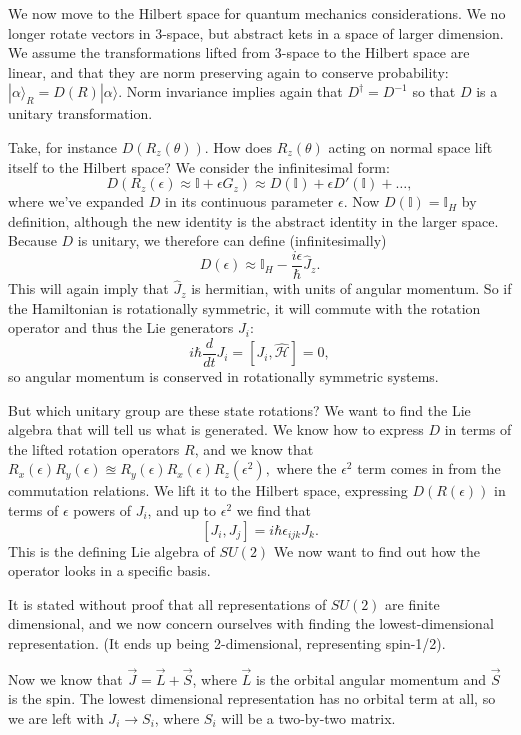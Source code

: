 \documentclass[fontsize=12pt]{scrartcl}
\newcommand{\bb}[1]{\mathbb{#1}}
\newcommand{\Id}{\bb{I}}
\newcommand{\ra}{\rangle}
\newcommand{\Ham}{\hat{\mathcal{H}}}
\begin{document}
We now move to the Hilbert space for quantum mechanics considerations. We no longer rotate vectors in 3-space, but abstract kets in a space of larger dimension. We assume the transformations lifted from 3-space to the Hilbert space are linear, and that they are norm preserving again to conserve probability: $|\alpha\ra_R=D(R)|\alpha\ra$. Norm invariance implies again that $D^\dagger=D^{-1}$ so that $D$ is a unitary transformation.

Take, for instance $D(R_z(\theta))$. How does $R_z(\theta)$ acting on normal space lift itself to the Hilbert space? We consider the infinitesimal form: $$D(R_z(\epsilon)\approx \Id +\epsilon G_z)\approx D(\Id)+\epsilon D'(\Id) +\dots,$$ where we've expanded $D$ in its continuous parameter $\epsilon$. Now $D(\Id)=\Id_H$ by definition, although the new identity is the abstract identity in the larger space. Because $D$ is unitary, we therefore can define (infinitesimally) $$D(\epsilon)\approx \Id_H-\frac{i\epsilon}{\hbar}\hat{J}_z.$$ This will again imply that $\hat{J}_z$ is hermitian, with units of angular momentum. So if the Hamiltonian is rotationally symmetric, it will commute with the rotation operator and thus the Lie generators $J_i$: $$i\hbar \frac{d}{dt}J_i=[J_i,\Ham]=0,$$ so angular momentum is conserved in rotationally symmetric systems.

But which unitary group are these state rotations? We want to find the Lie algebra that will tell us what is generated. We know how to express $D$ in terms of the lifted rotation operators $R$, and we know that $R_x(\epsilon)R_y(\epsilon)\approxeq R_y(\epsilon)R_x(\epsilon)R_z(\epsilon^2),$ where the $\epsilon^2$ term comes in from the commutation relations. We lift it to the Hilbert space, expressing $D(R(\epsilon))$ in terms of $\epsilon$ powers of $J_i$, and up to $\epsilon^2$ we find that $$[J_i,J_j]=i\hbar \epsilon_{ijk} J_k.$$ This is the defining Lie algebra of $SU(2)$ We now want to find out how the operator looks in a specific basis.

It is stated without proof that all representations of $SU(2)$ are finite dimensional, and we now concern ourselves with finding the lowest-dimensional representation. (It ends up being 2-dimensional, representing spin-1/2).

Now we know that $\vec{J}=\vec{L}+\vec{S}$, where $\vec{L}$ is the orbital angular momentum and $\vec{S}$ is the spin. The lowest dimensional representation has no orbital term at all, so we are left with $J_i\to S_i$, where $S_i$ will be a two-by-two matrix.
\end{document}
